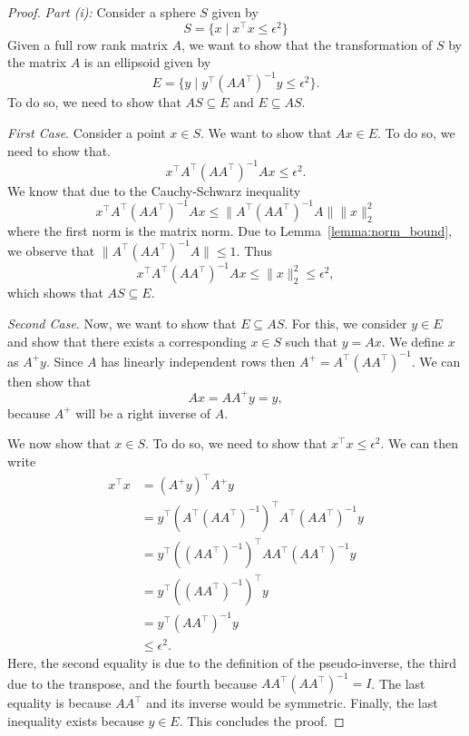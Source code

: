\documentclass{article}
\begin{document}
\begin{proof}
	\emph{Part (i):}
	Consider a sphere \(S\) given by 
	\[
	S = \{x \mid x^{\top}x \leq \epsilon^2\}	
	\]
	Given a full row rank matrix \(A\), we want to show that the transformation of \(S\) by the matrix \(A\) is an ellipsoid given by 
	\[
	E = \{y \mid y^{\top}(A A^{\top})^{-1}y \leq \epsilon^2\}.	
	\]
	To do so, we need to show that \(A S \subseteq E\) and \(E \subseteq A S\). 

	\emph{First Case}.
	Consider a point \(x \in S\). We want to show that \(A x \in E\).
	To do so, we need to show that. 
	\[
	x^{\top}A^{\top}(A A^{\top})^{-1}A x \leq \epsilon^2.	
	\]
	We know that due to the Cauchy-Schwarz inequality 
	\[
		x^{\top}A^{\top}(A A^{\top})^{-1}A x \leq \|A^{\top}(A A^{\top})^{-1}A\| \|x\|_2^2	
	\]
	where the first norm is the matrix norm.
	Due to Lemma~\ref{lemma:norm_bound}, we observe that \(\|A^{\top}(A A^{\top})^{-1}A\| \leq 1\). 
	Thus
	\[
		x^{\top}A^{\top}(A A^{\top})^{-1}A x \leq \|x\|_2^2	\leq \epsilon^2,
	\]
	which shows that \(A S \subseteq E\). 
	
	\emph{Second Case}.
	Now, we want to show that \(E \subseteq A S\). For this, we consider \(y \in E\) and show that there exists a corresponding \(x \in S\) such that \(y = Ax\).
	We define \(x\) as \(A^{+}y\). Since \(A\) has linearly independent rows then \(A^{+} = A^{\top}(A A^{\top})^{-1}\).
	We can then show that 
	\[
	A x = A A^{+} y = y, 	
	\]
	because \(A^{+}\) will be a right inverse of \(A\). 

	We now show that \(x \in S\). 
	To do so, we need to show that \(x^{\top}x \leq \epsilon^2\).
	We can then write 
	\begin{align*}
		x^{\top}x &= (A^{+}y)^{\top}A^{+} y \\
		&= y^{\top}(A^{\top}(A A^{\top})^{-1})^{\top}A^{\top}(A A^{\top})^{-1} y\\
		&= y^{\top}((A A^{\top})^{-1})^{\top}A A^{\top}(A A^{\top})^{-1} y\\
		&= y^{\top}((A A^{\top})^{-1})^{\top} y\\
		&= y^{\top}(A A^{\top})^{-1} y\\
		&\leq \epsilon^2.
	\end{align*}
	Here, the second equality is due to the definition of the pseudo-inverse, the third due to the transpose, and the fourth because \(AA^{\top}(AA^{\top})^{-1} = I\). 
	The last equality is because \(A A^{\top}\) and its inverse would be symmetric. 
	Finally, the last inequality exists because \(y \in E\). 
	This concludes the proof. 


\end{proof}
\end{document}
